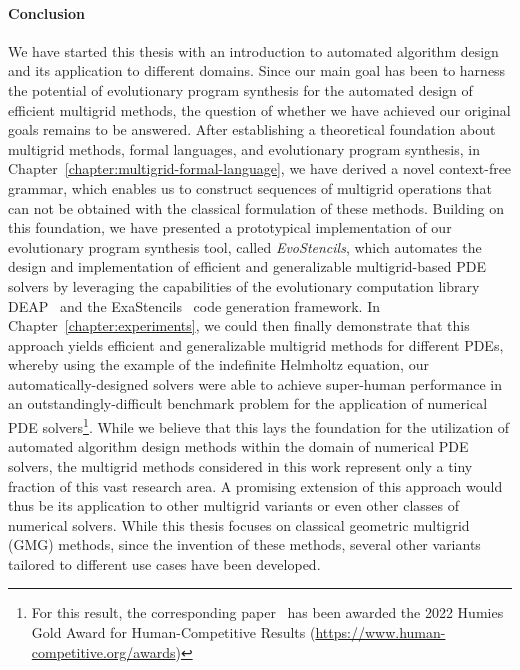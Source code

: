 \paragraph{Conclusion}
We have started this thesis with an introduction to automated algorithm design and its application to different domains.
Since our main goal has been to harness the potential of evolutionary program synthesis for the automated design of efficient multigrid methods, the question of whether we have achieved our original goals remains to be answered.
After establishing a theoretical foundation about multigrid methods, formal languages, and evolutionary program synthesis, in Chapter~\ref{chapter:multigrid-formal-language}, we have derived a novel context-free grammar, which enables us to construct sequences of multigrid operations that can not be obtained with the classical formulation of these methods.
Building on this foundation, we have presented a prototypical implementation of our evolutionary program synthesis tool, called \emph{EvoStencils}, which automates the design and implementation of efficient and generalizable multigrid-based PDE solvers by leveraging the capabilities of the evolutionary computation library DEAP~\cite{rainville2012deap} and the ExaStencils~\cite{lengauer2020exastencils} code generation framework.
In Chapter~\ref{chapter:experiments}, we could then finally demonstrate that this approach yields efficient and generalizable multigrid methods for different PDEs, whereby using the example of the indefinite Helmholtz equation, our automatically-designed solvers were able to achieve super-human performance in an outstandingly-difficult benchmark problem for the application of numerical PDE solvers\footnote{For this result, the corresponding paper~\cite{schmitt2022evolving} has been awarded the 2022 Humies Gold Award for Human-Competitive Results (\url{https://www.human-competitive.org/awards})}.
While we believe that this lays the foundation for the utilization of automated algorithm design methods within the domain of numerical PDE solvers, the multigrid methods considered in this work represent only a tiny fraction of this vast research area.
A promising extension of this approach would thus be its application to other multigrid variants or even other classes of numerical solvers.
While this thesis focuses on classical geometric multigrid (GMG) methods, since the invention of these methods, several other variants tailored to different use cases have been developed.
